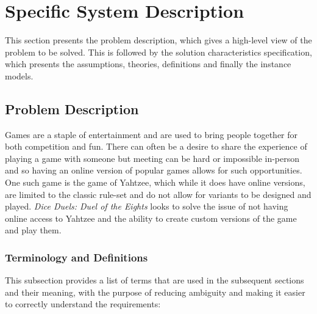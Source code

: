 \section{Specific System Description}

This section presents the problem description, which gives a high-level
view of the problem to be solved.  This is followed by the solution characteristics
specification, which presents the assumptions, theories, definitions and finally
the instance models.

\subsection{Problem Description} \label{Sec_pd}

Games are a staple of entertainment and are used to bring people together for both competition and fun.
There can often be a desire to share the experience of playing a game with someone but meeting can be hard or impossible in-person and so having an online version of popular games allows for such opportunities.
One such game is the game of Yahtzee, which while it does have online versions, are limited to the classic rule-set and do not allow for variants to be designed and played.
\textit{Dice Duels: Duel of the Eights} looks to solve the issue of not having online access to Yahtzee and the ability to create custom versions of the game and play them.

\subsubsection{Terminology and Definitions}

This subsection provides a list of terms that are used in the subsequent
sections and their meaning, with the purpose of reducing ambiguity and making it
easier to correctly understand the requirements:

